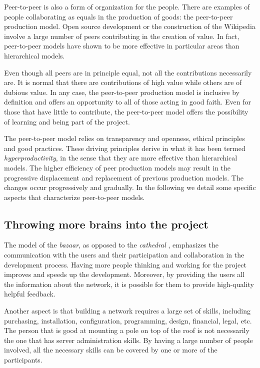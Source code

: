 \documentclass[journal]{IEEEtran}
\begin{document}
Peer-to-peer is also a form of organization for the people.
There are examples of people collaborating as equals in the production of goods: the peer-to-peer production model.
Open source development or the construction of the Wikipedia involve a large number of peers contributing in the creation of value.
In fact, peer-to-peer models have shown to be more effective in particular areas than hierarchical models.

Even though all peers are in principle equal, not all the contributions necessarily are.
It is normal that there are contributions of high value while others are of dubious value.
In any case, the peer-to-peer production model is inclusive by definition and offers an opportunity to all of those acting in good faith.
Even for those that have little to contribute, the peer-to-peer model offers the possibility of learning and being part of the project.

The peer-to-peer model relies on transparency and openness, ethical principles and good practices.
These driving principles derive in what it has been termed \emph{hyperproductivity}, in the sense that they are more effective than hierarchical models.
The higher efficiency of peer production models may result in the progressive displacement and replacement of previous production models.
The changes occur progressively and gradually.
In the following we detail some specific aspects that characterize peer-to-peer models.

\subsection{Throwing more brains into the project}

The model of the \emph{bazaar}, as opposed to the \emph{cathedral} \cite{raymond1999cb}, emphasizes the communication with the users and their participation and collaboration in the development process.
Having more people thinking and working for the project improves and speeds up the development.
Moreover, by providing the users all the information about the network, it is possible for them to provide high-quality helpful feedback.

Another aspect is that building a network requires a large set of skills, including purchasing, installation, configuration, programming, design, financial, legal, etc.
The person that is good at mounting a pole on top of the roof is not necessarily the one that has server administration skills.
By having a large number of people involved, all the necessary skills can be covered by one or more of the participants.
\end{document}
